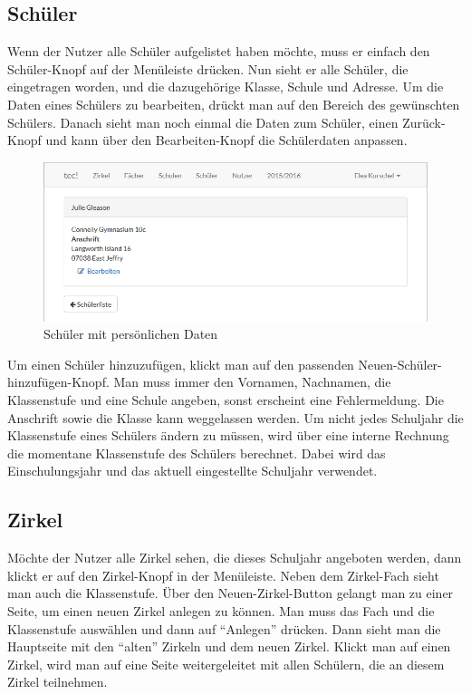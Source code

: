 \subsection{Schüler}
Wenn der Nutzer alle Schüler aufgelistet haben möchte, muss er einfach den Schüler-Knopf auf der Menüleiste drücken. Nun sieht er alle Schüler, die eingetragen worden, und die dazugehörige Klasse, Schule und Adresse. Um die Daten eines Schülers zu bearbeiten, drückt man auf den Bereich des gewünschten Schülers. Danach sieht man noch einmal die Daten zum Schüler, einen Zurück-Knopf und kann über den Bearbeiten-Knopf die Schülerdaten anpassen.

\begin{figure}[ht]
	\centering
	\includegraphics[scale=.5]{bilder/Schueler_Daten.png}
	\caption{Schüler mit persönlichen Daten}
\end{figure}

Um einen Schüler hinzuzufügen, klickt man auf den passenden Neuen-Schüler-hinzufügen-Knopf. Man muss immer den Vornamen, Nachnamen, die Klassenstufe und eine Schule angeben, sonst erscheint eine Fehlermeldung. Die Anschrift sowie die Klasse kann weggelassen werden. Um nicht jedes Schuljahr die Klassenstufe eines Schülers ändern zu müssen, wird über eine interne Rechnung die momentane Klassenstufe des Schülers berechnet. Dabei wird das Einschulungsjahr und das aktuell eingestellte Schuljahr verwendet.

\subsection{Zirkel}
Möchte der Nutzer alle Zirkel sehen, die dieses Schuljahr angeboten werden, dann klickt er auf den Zirkel-Knopf in der Menüleiste. Neben dem Zirkel-Fach sieht man auch die Klassenstufe. Über den Neuen-Zirkel-Button gelangt man zu einer Seite, um einen neuen Zirkel anlegen zu können. Man muss das Fach und die Klassenstufe auswählen und dann auf "`Anlegen"' drücken. Dann sieht man die Hauptseite mit den "`alten"' Zirkeln und dem neuen Zirkel. Klickt man auf einen Zirkel, wird man auf eine Seite weitergeleitet mit allen Schülern, die an diesem Zirkel teilnehmen. 

